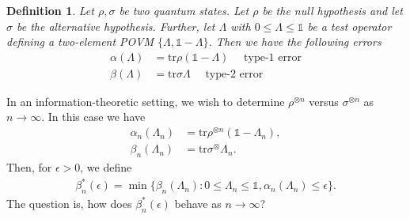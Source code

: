 \documentclass[notoc]{tufte-book}
\newtheorem{definition}[theorem]{Definition}
\begin{document}
\begin{tcolorbox}[colframe=white,breakable, colback=black!5, arc=0pt, outer arc=0pt]
\begin{definition}
\label{def:errors}
Let $\rho,\sigma$ be two quantum states. Let $\rho$ be the null hypothesis and let $\sigma$ be the alternative hypothesis. Further, let $\Lambda$ with $0\leq \Lambda \leq \mathbb{1}$ be a test operator defining a two-element POVM $\{\Lambda, \mathbb{1}-\Lambda\}$. Then we have the following errors
\begin{align}
    \alpha(\Lambda) &=\text{tr}\rho(\mathbb{1}-\Lambda) \quad \text{ type-1 error}\\
    \beta(\Lambda) &= \text{tr}\sigma \Lambda \quad \text{ type-2 error} 
\end{align}
\end{definition}
\end{tcolorbox}
In an information-theoretic setting, we wish to determine $\rho^{\otimes n}$ versus $\sigma^{\otimes n}$ as $n\rightarrow \infty$. In this case we have
\begin{align}
    \alpha_{n}(\Lambda_n) &= \text{tr} \rho^{\otimes n} (\mathbb{1}-\Lambda_n), \\
    \beta_n (\Lambda_n) &= \text{tr}\sigma^{\otimes} \Lambda_n.
\end{align}
Then, for $\epsilon >0$, we define
\begin{align}
    \beta_n^{*} (\epsilon) = \min \{\beta_n (\Lambda_n): 0 \leq \Lambda_n \leq \mathbb{1}, \alpha_n (\Lambda_n) \leq \epsilon\}.
\end{align}
The question is, how does $\beta^{*}_n(\epsilon)$ behave as $n \rightarrow \infty$?
\end{document}
